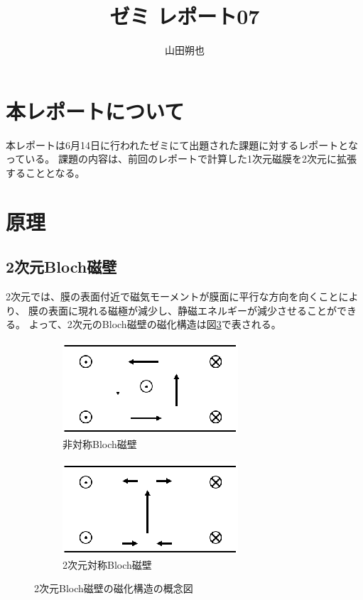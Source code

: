 \documentclass{jsarticle}
\begin{document}
\title{ゼミ レポート07}
\author{山田朔也}
\maketitle

\section{本レポートについて}
本レポートは6月14日に行われたゼミにて出題された課題に対するレポートとなっている。
課題の内容は、前回のレポートで計算した1次元磁膜を2次元に拡張することとなる。

\section{原理}
\subsection{2次元Bloch磁壁}
2次元では、膜の表面付近で磁気モーメントが膜面に平行な方向を向くことにより、
膜の表面に現れる磁極が減少し、静磁エネルギーが減少させることができる。
よって、2次元のBloch磁壁の磁化構造は図\ref{fig01}で表される。
\begin{figure}[H]
	\centering
	\begin{subfigure}{0.49\columnwidth}
		\centering
		\includegraphics[width=\columnwidth]{pic05.eps}
		\caption{非対称Bloch磁壁}
		\label{fig01_1}
	\end{subfigure}
	\begin{subfigure}{0.49\columnwidth}
		\centering
		\includegraphics[width=\columnwidth]{pic06.eps}
		\caption{2次元対称Bloch磁壁}
		\label{fig01_2}
	\end{subfigure}
	\caption{2次元Bloch磁壁の磁化構造の概念図}
	\label{fig01}
\end{figure}
\end{document}
